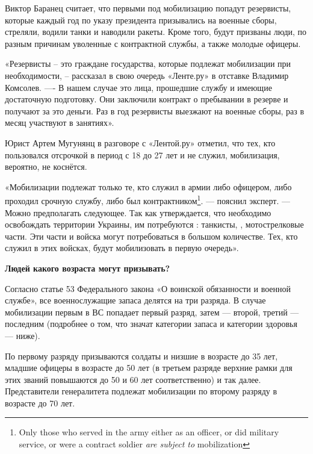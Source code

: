   Виктор Баранец считает, что первыми под мобилизацию попадут резервисты, которые каждый год по указу президента призывались на военные сборы, стреляли, водили танки и наводили ракеты. Кроме того, будут призваны люди, по разным причинам уволенные с контрактной службы, а также молодые офицеры.

«Резервисты -- это  граждане государства, которые подлежат мобилизации при необходимости, -- рассказал в свою очередь «Ленте.ру»  в отставке Владимир Комсолев. —- В нашем случае это лица, прошедшие службу и имеющие достаточную подготовку. Они заключили контракт о пребывании в резерве и получают за это деньги. Раз в год резервисты выезжают на военные сборы, раз в месяц участвуют в занятиях».

Юрист Артем Мугунянц в разговоре с «Лентой.ру» отметил, что тех, кто пользовался отсрочкой в период с 18 до 27 лет и не служил, мобилизация, вероятно, не коснётся.

«Мобилизации подлежат только те, кто служил в армии либо офицером, либо проходил срочную службу, либо был контрактником\footnote{Only those who served in the army either as an officer, or did military service, or were a contract soldier \textit{are subject to} mobilization}. — пояснил эксперт. — Можно предполагать следующее. Так как утверждается, что необходимо освобождать территории Украины, им потребуются : танкисты, , мотострелковые части. Эти части и войска могут потребоваться в большом количестве. Тех, кто служил в этих войсках, будут мобилизовать в первую очередь».

\textbf{Людей какого возраста могут призывать?}

Согласно статье 53 Федерального закона «О воинской обязанности и военной службе», все военнослужащие запаса делятся на три разряда. В случае мобилизации первым в ВС попадает первый разряд, затем — второй, третий — последним (подробнее о том, что значат категории запаса и категории здоровья — ниже).

По первому разряду призываются солдаты и низшие  в возрасте до 35 лет, младшие офицеры в возрасте до 50 лет (в третьем разряде верхние рамки для этих званий повышаются до 50 и 60 лет соответственно) и так далее. Представители генералитета подлежат мобилизации по второму разряду в возрасте до 70 лет.

